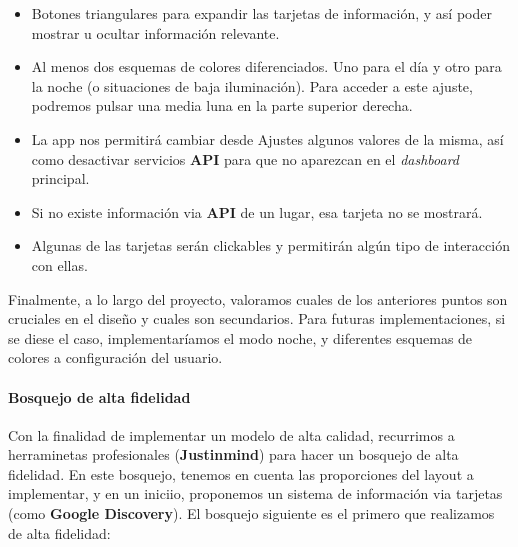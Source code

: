 \documentclass[../ei103948-project-documentation.tex]{subfiles}
\begin{document}
                                \begin{itemize}
                                    \item Botones triangulares para expandir las tarjetas de información, y así poder mostrar u ocultar información relevante.
                                    \item Al menos dos esquemas de colores diferenciados. Uno para el día y otro para la noche (o situaciones de baja iluminación). Para acceder a este ajuste, podremos pulsar una media luna en la parte superior derecha.
                                    \item La app nos permitirá cambiar desde Ajustes algunos valores de la misma, así como desactivar servicios \textbf{API} para que no aparezcan en el \textit{dashboard} principal.
                                    \item Si no existe información via \textbf{API} de un lugar, esa tarjeta no se mostrará.
                                    \item Algunas de las tarjetas serán clickables y permitirán algún tipo de interacción con ellas.
                                \end{itemize}

                                Finalmente, a lo largo del proyecto, valoramos cuales de los anteriores puntos son cruciales en el diseño y cuales son secundarios. Para futuras implementaciones, si se diese el caso, implementaríamos el modo noche, y diferentes esquemas de colores a configuración del usuario.


                                \paragraph{Bosquejo de alta fidelidad}
                                Con la finalidad de implementar un modelo de alta calidad, recurrimos a herraminetas profesionales (\textbf{Justinmind}) para hacer un bosquejo de alta fidelidad. En este bosquejo, tenemos en cuenta las proporciones del layout a implementar, y en un iniciio, proponemos un sistema de información via tarjetas (como \textbf{Google Discovery}). El bosquejo siguiente es el primero que realizamos de alta fidelidad:
\end{document}
